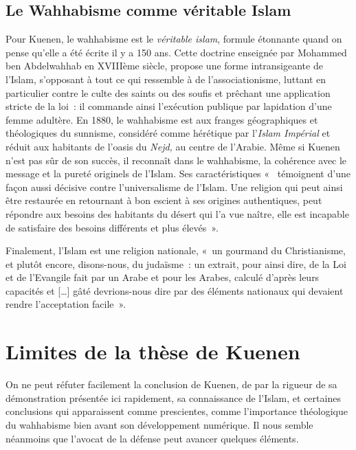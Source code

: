 \subsection{Le Wahhabisme comme véritable Islam}
Pour Kuenen, le wahhabisme est le \emph{véritable islam}, formule étonnante quand on pense qu'elle a été écrite il y a
150 ans. Cette doctrine enseignée par Mohammed ben Abdelwahhab en
XVIIIème siècle, propose une forme intransigeante de l'Islam, s'opposant
à tout ce qui ressemble à de l'associationisme, luttant en particulier
contre le culte des saints ou des soufis et prêchant une application
stricte de la loi~: il commande ainsi l'exécution publique par
lapidation d'une femme adultère. En 1880, le wahhabisme est aux franges
géographiques et théologiques du sunnisme, considéré comme hérétique par
l'\emph{Islam Impérial} et réduit aux habitants de l'oasis du
\emph{Nejd,} au centre de l'Arabie. Même si Kuenen n'est pas sûr de son
succès, il reconnaît dans le wahhabisme, la cohérence avec le message et
la pureté originels de l'Islam. Ses
caractéristiques «~ témoignent d'une façon aussi décisive contre
l'universalisme de l'Islam. Une religion qui peut ainsi être restaurée
en retournant à bon escient à ses origines authentiques, peut répondre
aux besoins des habitants du désert qui l'a vue naître, elle est
incapable de satisfaire des besoins différents et plus
élevés~».

Finalement, l'Islam est une religion nationale, «~un gourmand du
Christianisme, et plutôt encore, disons-nous, du judaïsme~: un extrait,
pour ainsi dire, de la Loi et de l'Evangile fait par un Arabe et pour
les Arabes, calculé d'après leurs capacités et {[}\ldots{]} gâté
devrions-nous dire par des éléments nationaux qui devaient rendre
l'acceptation facile~».
\section{Limites de la thèse de Kuenen}
On ne peut réfuter facilement la conclusion de Kuenen, de par la rigueur
de sa démonstration présentée ici rapidement, sa connaissance de
l'Islam, et certaines conclusions qui apparaissent comme prescientes,
comme l'importance théologique du wahhabisme bien avant son
développement numérique. Il nous semble néanmoins que l'avocat de la
défense peut avancer quelques éléments.

